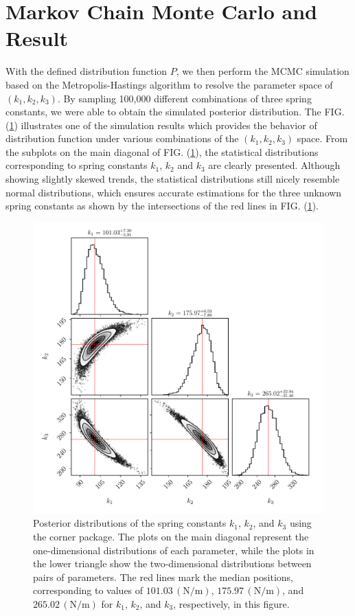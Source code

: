 \documentclass[12pt, a4paper, reprint, nofootinbib, twoside,  showkeys]{revtex4-1}
\begin{document}
\section{Markov Chain Monte Carlo and Result}
With the defined distribution function $P$, we then perform the MCMC simulation based on the Metropolis-Hastings algorithm to resolve the parameter space of $\left(k_1,k_2,k_3\right)$. By sampling 100,000 different combinations of three spring constants, we were able to obtain the simulated posterior distribution. The FIG. (\ref{fig:MCMC_corner}) illustrates one of the simulation results which provides the behavior of distribution function under various combinations of the $\left(k_1,k_2,k_3\right)$ space. From the subplots on the main diagonal of FIG. (\ref{fig:MCMC_corner}), the statistical distributions corresponding to spring constants $k_1$, $k_2$ and $k_3$ are clearly presented. Although showing slightly skewed trends, the statistical distributions still nicely resemble normal distributions, which ensures accurate estimations for the three unknown spring constants as shown by the intersections of the red lines in FIG. (\ref{fig:MCMC_corner}). 
\begin{figure}[h]
\centering
\includegraphics[width=\linewidth]{image/MCMC_corner.pdf}
\caption{Posterior distributions of the spring constants $k_1$, $k_2$, and $k_3$ using the corner package. The plots on the main diagonal represent the one-dimensional distributions of each parameter, while the plots in the lower triangle show the two-dimensional distributions between pairs of parameters. The red lines mark the median positions, corresponding to values of $101.03\,(\mathrm{N/m})$, $175.97\,(\mathrm{N/m})$, and $265.02\,(\mathrm{N/m})$ for $k_1$, $k_2$, and $k_3$, respectively, in this figure.}
\label{fig:MCMC_corner}
\end{figure}
\end{document}
